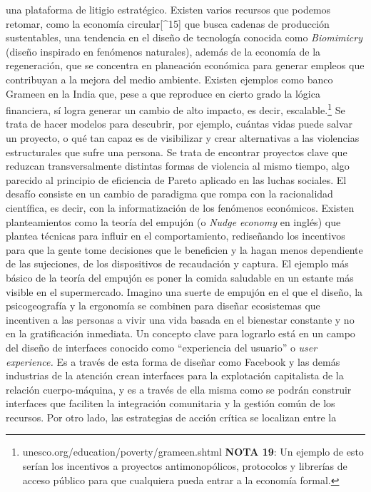 \documentclass[
]{article}
\begin{document}
una plataforma de litigio estratégico. Existen varios recursos que
podemos retomar, como la economía circular{[}\^{}15{]} que busca cadenas
de producción sustentables, una tendencia en el diseño de tecnología
conocida como \emph{Biomimicry} (diseño inspirado en fenómenos
naturales), además de la economía de la regeneración, que se concentra
en planeación económica para generar empleos que contribuyan a la mejora
del medio ambiente. Existen ejemplos como banco Grameen en la India que,
pese a que reproduce en cierto grado la lógica financiera, sí logra
generar un cambio de alto impacto, es decir, escalable.\footnote{unesco.org/education/poverty/grameen.shtml
  \textbf{NOTA 19}: Un ejemplo de esto serían los incentivos a proyectos
  antimonopólicos, protocolos y librerías de acceso público para que
  cualquiera pueda entrar a la economía formal.} Se trata de hacer
modelos para descubrir, por ejemplo, cuántas vidas puede salvar un
proyecto, o qué tan capaz es de visibilizar y crear alternativas a las
violencias estructurales que sufre una persona. Se trata de encontrar
proyectos clave que reduzcan transversalmente distintas formas de
violencia al mismo tiempo, algo parecido al principio de eficiencia de
Pareto aplicado en las luchas sociales. El desafío consiste en un cambio
de paradigma que rompa con la racionalidad científica, es decir, con la
informatización de los fenómenos económicos. Existen planteamientos como
la teoría del empujón (o \emph{Nudge economy} en inglés) que plantea
técnicas para influir en el comportamiento, rediseñando los incentivos
para que la gente tome decisiones que le beneficien y la hagan menos
dependiente de las sujeciones, de los dispositivos de recaudación y
captura. El ejemplo más básico de la teoría del empujón es poner la
comida saludable en un estante más visible en el supermercado. Imagino
una suerte de empujón en el que el diseño, la psicogeografía y la
ergonomía se combinen para diseñar ecosistemas que incentiven a las
personas a vivir una vida basada en el bienestar constante y no en la
gratificación inmediata. Un concepto clave para lograrlo está en un
campo del diseño de interfaces conocido como ``experiencia del usuario''
o \emph{user experience.} Es a través de esta forma de diseñar como
Facebook y las demás industrias de la atención crean interfaces para la
explotación capitalista de la relación cuerpo-máquina, y es a través de
ella misma como se podrán construir interfaces que faciliten la
integración comunitaria y la gestión común de los recursos. Por otro
lado, las estrategias de acción crítica se localizan entre la
\end{document}
